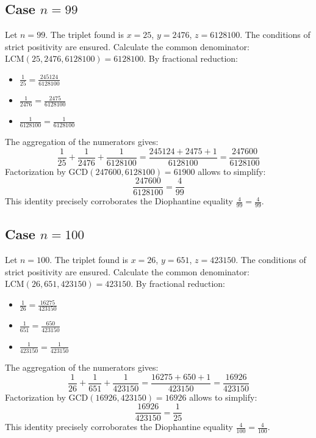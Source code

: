 \documentclass[11pt,a4paper]{article}
\begin{document}
\subsection{Case $n = 99$}
Let $n = 99$. The triplet found is $x = 25$, $y = 2476$, $z = 6128100$.
The conditions of strict positivity are ensured.
Calculate the common denominator: $\text{LCM}(25, 2476, 6128100) = 6128100$.
By fractional reduction:
\begin{itemize}
    \item $\frac{1}{25} = \frac{245124}{6128100}$
    \item $\frac{1}{2476} = \frac{2475}{6128100}$
    \item $\frac{1}{6128100} = \frac{1}{6128100}$
\end{itemize}
The aggregation of the numerators gives:
$$ \frac{1}{25} + \frac{1}{2476} + \frac{1}{6128100} = \frac{245124 + 2475 + 1}{6128100} = \frac{247600}{6128100} $$
Factorization by $\text{GCD}(247600, 6128100) = 61900$ allows to simplify:
$$ \frac{247600}{6128100} = \frac{4}{99} $$
This identity precisely corroborates the Diophantine equality $\frac{4}{99} = \frac{4}{99}$.

\subsection{Case $n = 100$}
Let $n = 100$. The triplet found is $x = 26$, $y = 651$, $z = 423150$.
The conditions of strict positivity are ensured.
Calculate the common denominator: $\text{LCM}(26, 651, 423150) = 423150$.
By fractional reduction:
\begin{itemize}
    \item $\frac{1}{26} = \frac{16275}{423150}$
    \item $\frac{1}{651} = \frac{650}{423150}$
    \item $\frac{1}{423150} = \frac{1}{423150}$
\end{itemize}
The aggregation of the numerators gives:
$$ \frac{1}{26} + \frac{1}{651} + \frac{1}{423150} = \frac{16275 + 650 + 1}{423150} = \frac{16926}{423150} $$
Factorization by $\text{GCD}(16926, 423150) = 16926$ allows to simplify:
$$ \frac{16926}{423150} = \frac{1}{25} $$
This identity precisely corroborates the Diophantine equality $\frac{4}{100} = \frac{4}{100}$.
\end{document}
